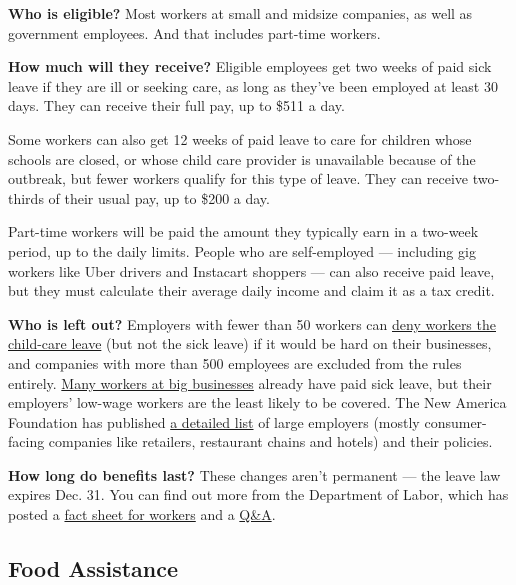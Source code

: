 \textbf{Who is eligible?} Most workers at small and midsize companies,
as well as government employees. And that includes part-time workers.

\textbf{How much will they receive?} Eligible employees get two weeks of
paid sick leave if they are ill or seeking care, as long as they've been
employed at least 30 days. They can receive their full pay, up to \$511
a day.

Some workers can also get 12 weeks of paid leave to care for children
whose schools are closed, or whose child care provider is unavailable
because of the outbreak, but fewer workers qualify for this type of
leave. They can receive two-thirds of their usual pay, up to \$200 a
day.

Part-time workers will be paid the amount they typically earn in a
two-week period, up to the daily limits. People who are self-employed
--- including gig workers like Uber drivers and Instacart shoppers ---
can also receive paid leave, but they must calculate their average daily
income and claim it as a tax credit.

\textbf{Who is left out?} Employers with fewer than 50 workers can
\href{https://www.nytimes3xbfgragh.onion/2020/04/02/us/politics/coronavirus-paid-leave.html}{deny
workers the child-care leave} (but not the sick leave) if it would be
hard on their businesses, and companies with more than 500 employees are
excluded from the rules entirely.
\href{https://www.bls.gov/ncs/ebs/benefits/2019/ownership/private/table31a.pdf}{Many
workers at big businesses} already have paid sick leave, but their
employers' low-wage workers are the least likely to be covered. The New
America Foundation has published
\href{https://www.newamerica.org/better-life-lab/reports/which-companies-still-arent-offering-paid-sick-days/}{a
detailed list} of large employers (mostly consumer-facing companies like
retailers, restaurant chains and hotels) and their policies.

\textbf{How long do benefits last?} These changes aren't permanent ---
the leave law expires Dec. 31. You can find out more from the Department
of Labor, which has posted a
\href{https://www.dol.gov/agencies/whd/pandemic/ffcra-employee-paid-leave}{fact
sheet for workers} and a
\href{https://www.dol.gov/agencies/whd/pandemic/ffcra-questions}{Q\&A}.

\hypertarget{food-assistance}{%
\subsection{Food Assistance}\label{food-assistance}}

